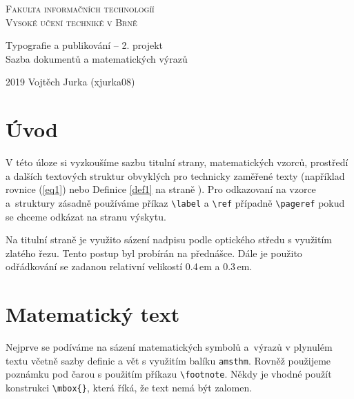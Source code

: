 \documentclass[11pt, a4paper]{article}
\theoremstyle{definition}
\begin{document}
\thispagestyle{empty}
\begin{center}
{\Huge\textsc{Fakulta informačních technologíí \\ Vysoké učení techniké v Brně}\\}


{\LARGE Typografie a publikování – 2. projekt \\ Sazba dokumentů a matematických výrazů\\}
    

\end{center}

{\LARGE 2019 \hfill Vojtěch Jurka (xjurka08)}

\newpage
\twocolumn

\setcounter{page}{1}
\label{page}

\section*{Úvod}
V této úloze si vyzkoušíme sazbu titulní strany, matematic\-kých vzorců, prostředí a dalších textových struktur obvyklých pro technicky zaměřené texty (například rovnice (\ref{eq1}) nebo Definice \ref{def1} na straně \pageref{page}). Pro odkazovaní na vzorce a~struktury zásadně používáme příkaz \verb|\label| a \verb|\ref| případně \verb|\pageref| pokud se chceme odkázat na stranu výskytu.

Na titulní straně je využito sázení nadpisu podle optického středu s využitím zlatého řezu. Tento postup byl probírán na přednášce. Dále je použito odřádkování se zadanou relativní velikostí 0.4\,em a 0.3\,em.

\section{Matematický text} 

Nejprve se podíváme na sázení matematických symbolů a~výrazů v plynulém textu včetně sazby definic a vět s využitím balíku \verb|amsthm|. Rovněž použijeme poznámku pod čarou s použitím příkazu \verb|\footnote|. Někdy je vhodné použít konstrukci \verb|\mbox{}|, která říká, že text nemá být zalomen.
\end{document}
